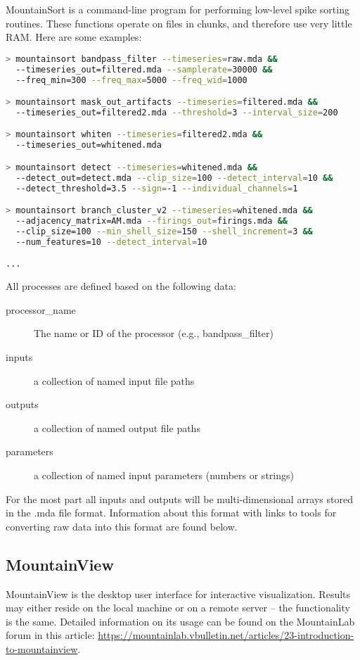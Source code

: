 \documentclass{article}
\begin{document}
MountainSort is a command-line program for performing low-level spike sorting routines. These functions operate on files in chunks, and therefore use very little RAM. Here are some examples:
\begin{lstlisting}[language=bash]
> mountainsort bandpass_filter --timeseries=raw.mda &&
  --timeseries_out=filtered.mda --samplerate=30000 &&
  --freq_min=300 --freq_max=5000 --freq_wid=1000

> mountainsort mask_out_artifacts --timeseries=filtered.mda &&
  --timeseries_out=filtered2.mda --threshold=3 --interval_size=200

> mountainsort whiten --timeseries=filtered2.mda &&
  --timeseries_out=whitened.mda

> mountainsort detect --timeseries=whitened.mda &&
  --detect_out=detect.mda --clip_size=100 --detect_interval=10 &&
  --detect_threshold=3.5 --sign=-1 --individual_channels=1

> mountainsort branch_cluster_v2 --timeseries=whitened.mda &&
  --adjacency_matrix=AM.mda --firings_out=firings.mda &&
  --clip_size=100 --min_shell_size=150 --shell_increment=3 &&
  --num_features=10 --detect_interval=10

...
\end{lstlisting}

All processes are defined based on the following data:
\begin{description}
\item[processor\_name] The name or ID of the processor (e.g., bandpass\_filter)
\item[inputs] a collection of named input file paths
\item[outputs] a collection of named output file paths
\item[parameters] a collection of named input parameters (numbers or strings)
\end{description}

For the most part all inputs and outputs will be multi-dimensional arrays stored in the .mda file format. Information about this format with links to tools for converting raw data into this format are found below.

\subsection{MountainView}

MountainView is the desktop user interface for interactive visualization. Results may either reside on the local machine or on a remote server -- the functionality is the same. Detailed information on its usage can be found on the MountainLab forum in this article: \url{https://mountainlab.vbulletin.net/articles/23-introduction-to-mountainview}.
\end{document}
